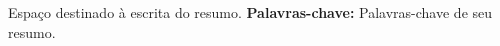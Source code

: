 \begin{resumo}
Espaço destinado à escrita do resumo.
\textbf{Palavras-chave:} Palavras-chave de seu resumo.
\end{resumo}
